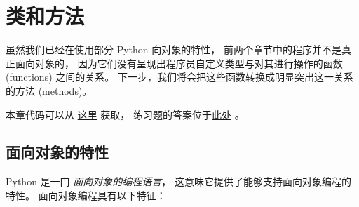 

\chapter{类和方法}


虽然我们已经在使用部分 Python 向对象的特性，
前两个章节中的程序并不是真正面向对象的，
因为它们没有呈现出程序员自定义类型与对其进行操作的函数 (functions) 之间的关系。
下一步，我们将会把这些函数转换成明显突出这一关系的方法 (methods)。



本章代码可以从 \href{http://thinkpython2.com/code/Time2.py}{这里} 获取，
练习题的答案位于\href{http://thinkpython2.com/code/Point2_soln.py}{此处} 。


\section{面向对象的特性}
  


Python 是一门 {\em 面向对象的编程语言}，
这意味它提供了能够支持面向对象编程的特性。
面向对象编程具有以下特征：


